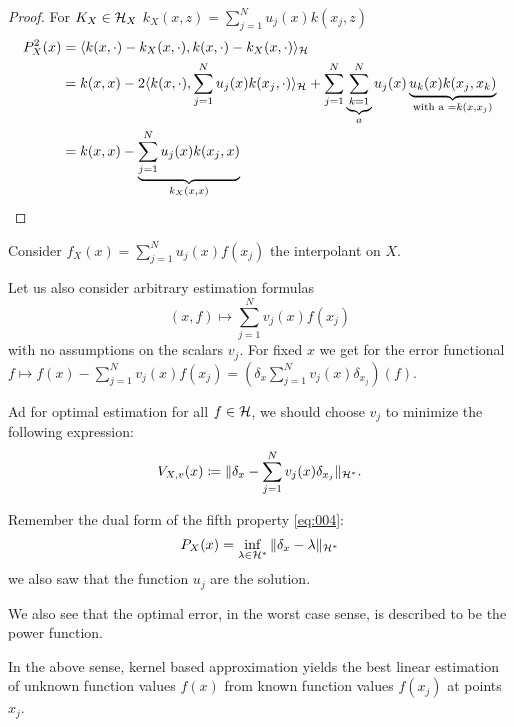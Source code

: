 \begin{proof}
    For $K_X\in \mathcal{H}_X$ $k_X(x,z)=\sum_{j=1}^{N}u_j(x)k(x_j,z)$
    \begin{align*}
        P_X^2(x)&=\langle k(x,\cdot)-k_X(x,\cdot),k(x,\cdot)-k_X(x,\cdot) \rangle_{\mathcal{H}}\\
        &=k(x,x)-2\langle k(x,\cdot),\sum_{j=1}^N u_j(x)k(x_j,\cdot) \rangle_{\mathcal{H}}+\sum_{j=1}^N\underbrace{\sum_{k=1}^{N}}_{a}u_j(x)\underbrace{u_k(x)k(x_j,x_k)}_{\text{with a } =k(x,x_j)}\\
        &=k(x,x)-\underbrace{\sum_{j=1}^N u_j(x)k(x_j,x)}_{k_X(x,x)}\qedhere
    \end{align*}    
\end{proof}

Consider $f_X(x)=\sum_{j=1}^Nu_j(x)f(x_j)$ the interpolant on $X$.

Let us also consider arbitrary estimation formulas 
\[(x,f)\mapsto \sum_{j=1}^N v_j(x)f(x_j)\]
with no assumptions on the scalars $v_j$. For fixed $x$ we get for the 
error functional $f\mapsto f(x)-\sum_{j=1}^{N} v_j(x)f(x_j)=\left(\delta_x \sum_{j=1}^N v_j(x)\delta_{x_j}\right)(f)$.

Ad for optimal estimation for all $f\in\mathcal{H}$, we should choose 
$v_j$ to minimize the following expression:
\[V_{X,v}(x)\coloneqq \Vert \delta_x-\sum_{j=1}^{N} v_j(x)\delta_{x_j}\Vert_{\mathcal{H}^*}.\]

Remember the dual form of the fifth property \ref{eq:004}:
\[P_X(x)=\inf_{\lambda\in\mathcal{H}^*}\Vert \delta_x-\lambda\Vert_{\mathcal{H}^*}\] 
we also saw that the function $u_j$ are the solution.

We also see that the optimal error, in the worst case sense, is described to be the power function.

\begin{theorem}\label{thm:2.5}
    In the above sense, kernel based approximation yields the best linear 
    estimation of unknown function values $f(x)$ from known function values $f(x_j)$
    at points $x_j$.
\end{theorem}

